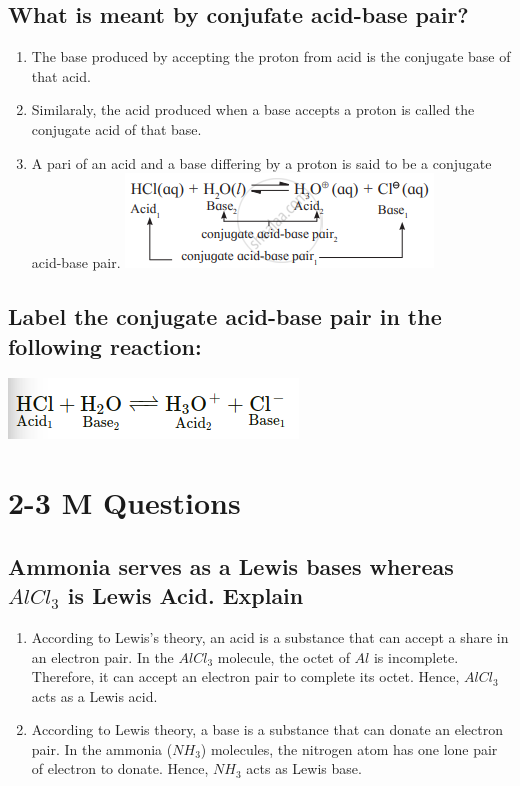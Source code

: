 \documentclass{article}
\begin{document}
   \subsection{What is meant by conjufate acid-base pair?}
   \begin{enumerate}
   	\item The base produced by accepting the proton from acid is the
	conjugate base of that acid.
	\item Similaraly, the acid produced when a base accepts a proton is
	called the conjugate acid of that base.
	\item A pari of an acid and a base differing by a proton is said 
	to be a conjugate acid-base pair.
	\includegraphics[scale=0.5]{conjugate}
   \end{enumerate}

   \subsection{Label the conjugate acid-base pair in the following reaction:
   }
   \includegraphics[scale=0.5]{acid-base}

   \section{2-3 M Questions}
   \subsection{Ammonia serves as a Lewis bases whereas $AlCl_3$ is Lewis 
   Acid. Explain}
   \begin{enumerate}
   	\item According to Lewis's theory, an acid is a substance that can 
	accept a share in an electron pair. In the $AlCl_3$ molecule, the 
	octet of $Al$ is incomplete. Therefore, it can accept an electron 
	pair to complete its octet. Hence, $AlCl_3$ acts as a Lewis acid.

	\item According to Lewis theory, a base is a substance that can 
	donate an electron pair. In the ammonia ($NH_3$) molecules, the 
	nitrogen atom has one lone pair of electron to donate. Hence, 
	$NH_3$ acts as Lewis base.
   \end{enumerate}

   
\end{document}
